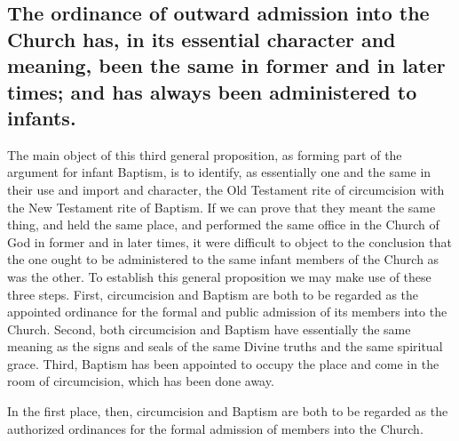 \documentclass[]{book}
\begin{document}
\hypertarget{the-ordinance-of-outward-admission-into-the-church-has-in-its-essential-character-and-meaning-been-the-same-in-former-and-in-later-times-and-has-always-been-administered-to-infants.}{%
\subsection{The ordinance of outward admission into the Church has, in its essential character and meaning, been the same in former and in later times; and has always been administered to infants.}\label{the-ordinance-of-outward-admission-into-the-church-has-in-its-essential-character-and-meaning-been-the-same-in-former-and-in-later-times-and-has-always-been-administered-to-infants.}}

The main object of this third general proposition, as forming part of the argument for infant Baptism, is to identify, as essentially one and the same in their use and import and character, the Old Testament rite of circumcision with the New Testament rite of Baptism. If we can prove that they meant the same thing, and held the same place, and performed the same office in the Church of God in former and in later times, it were difficult to object to the conclusion that the one ought to be administered to the same infant members of the Church as was the other. To establish this general proposition we may make use of these three steps. First, circumcision and Baptism are both to be regarded as the appointed ordinance for the formal and public admission of its members into the Church. Second, both circumcision and Baptism have essentially the same meaning as the signs and seals of the same Divine truths and the same spiritual grace. Third, Baptism has been appointed to occupy the place and come in the room of circumcision, which has been done away.

In the first place, then, circumcision and Baptism are both to be regarded as the authorized ordinances for the formal admission of members into the Church.
\end{document}
